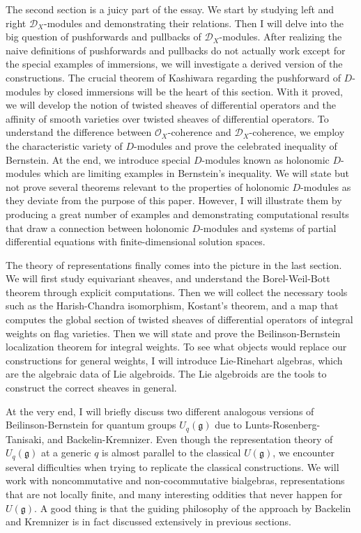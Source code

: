 \documentclass[11pt, a4paper]{article}
\theoremstyle{definition}
\newcommand{\g}{\mathfrak g}
\begin{document}
    The second section is a juicy part of the essay. We start by studying left and right $\mathcal D_X$-modules and demonstrating their relations. Then I will delve into the big question of pushforwards and pullbacks of $\mathcal D_X$-modules. After realizing the naive definitions of pushforwards and pullbacks do not actually work except for the special examples of immersions, we will investigate a derived version of the constructions. The crucial theorem of Kashiwara regarding the pushforward of $D$-modules by closed immersions will be the heart of this section. With it proved, we will develop the notion of twisted sheaves of differential operators and the affinity of smooth varieties over twisted sheaves of differential operators. To understand the difference between $\mathcal O_X$-coherence and $\mathcal D_X$-coherence, we employ the characteristic variety of $D$-modules and prove the celebrated inequality of Bernstein. At the end, we introduce special $D$-modules known as holonomic $D$-modules which are limiting examples in Bernstein's inequality. We will state but not prove several theorems relevant to the properties of holonomic $D$-modules as they deviate from the purpose of this paper. However, I will illustrate them by producing a great number of examples and demonstrating computational results that draw a connection between holonomic $D$-modules and systems of partial differential equations with finite-dimensional solution spaces.

    The theory of representations finally comes into the picture in the last section. We will first study equivariant sheaves, and understand the Borel-Weil-Bott theorem through explicit computations. Then we will collect the necessary tools such as the Harish-Chandra isomorphism, Kostant's theorem, and a map that computes the global section of twisted sheaves of differential operators of integral weights on flag varieties. Then we will state and prove the Beilinson-Bernstein localization theorem for integral weights. To see what objects would replace our constructions for general weights, I will introduce Lie-Rinehart algebras, which are the algebraic data of Lie algebroids. The Lie algebroids are the tools to construct the correct sheaves in general. 

    At the very end, I will briefly discuss two different analogous versions of Beilinson-Bernstein for quantum groups $U_q(\g)$ due to Lunts-Rosenberg-Tanisaki, and Backelin-Kremnizer. Even though the representation theory of $U_q(\g)$ at a generic $q$ is almost parallel to the classical $U(\g)$, we encounter several difficulties when trying to replicate the classical constructions. We will work with noncommutative and non-cocommutative bialgebras, representations that are not locally finite, and many interesting oddities that never happen for $U(\g)$. A good thing is that the guiding philosophy of the approach by Backelin and Kremnizer is in fact discussed extensively in previous sections.
\end{document}
